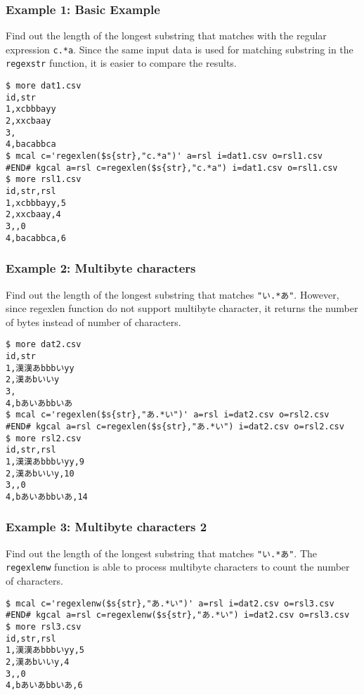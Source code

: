\subsubsection*{Example 1: Basic Example}

Find out the length of the longest substring that matches with the regular expression \verb|c.*a|. Since the same input data is used for matching substring in the \verb|regexstr| function, it is easier to compare the results.


\begin{Verbatim}[baselinestretch=0.7,frame=single]
$ more dat1.csv
id,str
1,xcbbbayy
2,xxcbaay
3,
4,bacabbca
$ mcal c='regexlen($s{str},"c.*a")' a=rsl i=dat1.csv o=rsl1.csv
#END# kgcal a=rsl c=regexlen($s{str},"c.*a") i=dat1.csv o=rsl1.csv
$ more rsl1.csv
id,str,rsl
1,xcbbbayy,5
2,xxcbaay,4
3,,0
4,bacabbca,6
\end{Verbatim}
\subsubsection*{Example 2: Multibyte characters}

Find out the length of the longest substring that matches \verb|"い.*あ"|. However, since regexlen function do not support multibyte character, it returns the number of bytes instead of number of characters.


\begin{Verbatim}[baselinestretch=0.7,frame=single]
$ more dat2.csv
id,str
1,漢漢あbbbいyy
2,漢あbいいy
3,
4,bあいあbbいあ
$ mcal c='regexlen($s{str},"あ.*い")' a=rsl i=dat2.csv o=rsl2.csv
#END# kgcal a=rsl c=regexlen($s{str},"あ.*い") i=dat2.csv o=rsl2.csv
$ more rsl2.csv
id,str,rsl
1,漢漢あbbbいyy,9
2,漢あbいいy,10
3,,0
4,bあいあbbいあ,14
\end{Verbatim}
\subsubsection*{Example 3: Multibyte characters 2}

Find out the length of the longest substring that matches \verb|"い.*あ"|. The \verb|regexlenw| function is able to process multibyte characters to count the number of characters.


\begin{Verbatim}[baselinestretch=0.7,frame=single]
$ mcal c='regexlenw($s{str},"あ.*い")' a=rsl i=dat2.csv o=rsl3.csv
#END# kgcal a=rsl c=regexlenw($s{str},"あ.*い") i=dat2.csv o=rsl3.csv
$ more rsl3.csv
id,str,rsl
1,漢漢あbbbいyy,5
2,漢あbいいy,4
3,,0
4,bあいあbbいあ,6
\end{Verbatim}

